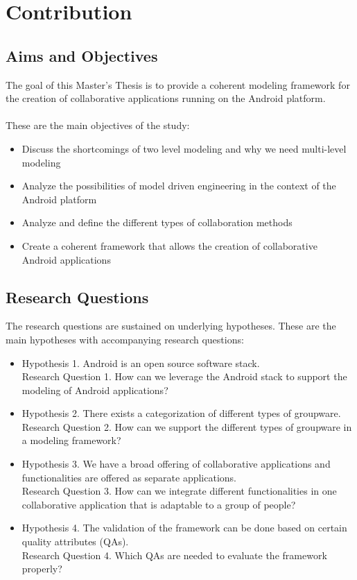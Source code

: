 \section{Contribution}

\subsection{Aims and Objectives}

The goal of this Master's Thesis is to provide a coherent modeling framework for the creation of collaborative applications running on the Android platform. 
\\ \\
These are the main objectives of the study:

\begin{itemize}
\item{Discuss the shortcomings of two level modeling and why we need multi-level modeling}
\item{Analyze the possibilities of model driven engineering in the context of the Android platform}
\item{Analyze and define the different types of collaboration methods}
\item{Create a coherent framework that allows the creation of collaborative Android applications}
\end{itemize}

\subsection{Research Questions}

The research questions are sustained on underlying hypotheses. These are the main hypotheses with accompanying research questions:

\begin{itemize}
\item{Hypothesis 1. Android is an open source software stack. \\
Research Question 1. How can we leverage the Android stack to support the modeling of Android applications?}
\item{Hypothesis 2. There exists a categorization of different types of groupware. \\
Research Question 2. How can we support the different types of groupware in a modeling framework?}
\item{Hypothesis 3. We have a broad offering of collaborative applications and functionalities are offered as separate applications. \\
Research Question 3. How can we integrate different functionalities in one collaborative application that is adaptable to a group of people?}
\item{Hypothesis 4. The validation of the framework can be done based on certain quality attributes (QAs). \\
Research Question 4. Which QAs are needed to evaluate the framework properly?}
\end{itemize}

